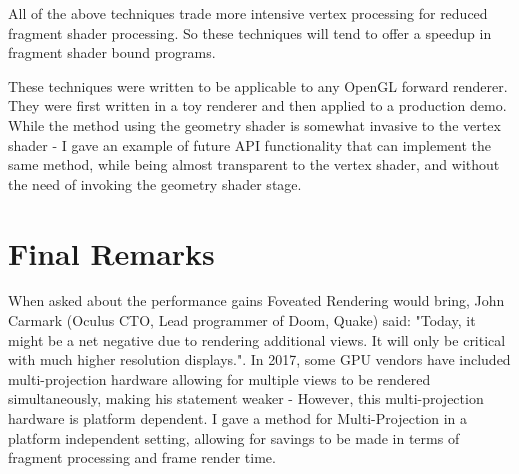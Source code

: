 \documentclass[12pt,a4paper,twoside,openright]{report}
\begin{document}
All of the above techniques trade more intensive vertex processing for reduced fragment shader processing. So these techniques will tend to offer a speedup in fragment shader bound programs. 

These techniques were written to be applicable to any OpenGL forward renderer. They were first written in a toy renderer and then applied to a production demo.
While the method using the geometry shader is somewhat invasive to the vertex shader - I gave an example of future API functionality that can implement the same method, while being almost transparent to the vertex shader, and without the need of invoking the geometry shader stage.

\section{Final Remarks}

When asked about the performance gains Foveated Rendering would bring, John Carmark (Oculus CTO, Lead programmer of Doom, Quake) said: "Today, it might be a net negative due to rendering additional views. It will only be critical with much higher resolution displays.". In 2017, some GPU vendors have included multi-projection hardware allowing for multiple views to be rendered simultaneously, making his statement weaker - However, this multi-projection hardware is platform dependent. I gave a method for Multi-Projection in a platform independent setting, allowing for savings to be made in terms of fragment processing and frame render time.



\appendix
\end{document}
